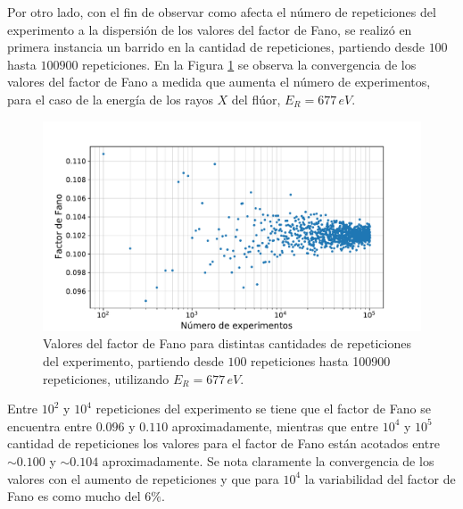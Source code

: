 Por otro lado, con el fin de observar como afecta el número de repeticiones del experimento a la dispersión de los valores del factor de Fano, se realizó en primera instancia un barrido en la cantidad de repeticiones, partiendo desde $100$ hasta $100900$ repeticiones. En la Figura \ref{fig:FanoConvergencia} se observa la convergencia de los valores del factor de Fano a medida que aumenta el número de experimentos, para el caso de la energía de los rayos $X$ del flúor, $E_{R} = 677\,\si{eV}$.
\begin{figure}[h]
    \centering
    \includegraphics[scale=0.5]{Figs/FanoConvergencia.pdf}
    \caption{Valores del factor de Fano para distintas cantidades de repeticiones del experimento, partiendo desde $100$ repeticiones hasta 100900 repeticiones, utilizando $E_{R} = 677\,\si{eV}$.}
    \label{fig:FanoConvergencia}
\end{figure}
Entre $10^{2}$ y $10^{4}$ repeticiones del experimento se tiene que el factor de Fano se encuentra entre $0.096$ y $0.110$ aproximadamente, mientras que entre $10^{4}$ y $10^{5}$ cantidad de repeticiones los valores para el factor de Fano están acotados entre $\sim 0.100$ y $\sim 0.104$ aproximadamente. Se nota claramente la convergencia de los valores con el aumento de repeticiones y que para $10^{4}$ la variabilidad del factor de Fano es como mucho del $6\%$.



